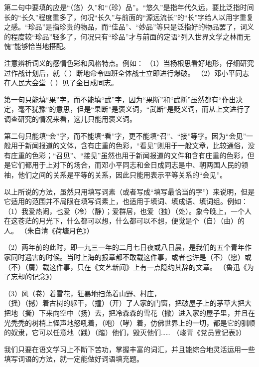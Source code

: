 第二句中要填的应是“（悠）久”和“（珍）品”。“悠久”是指年代久远，要比泛指时间长的“长久”程度重多了，何况“长久”与前面的“源远流长”的“长”字给人以用字重复之感。“珍品”是指珍贵的物品，而“佳品”、“妙品”等只是泛指好的物品罢了，词义的程度较“珍品”轻多了，何况只有“珍品”才与前面的定语“列入世界文学之林而无愧”能够恰当地搭配。

注意辨析词义的感情色彩和风格特点。例如：
（1）当杨根思看好地形，仔细研究过作战计划后，就（ ）断地命令四班全体战士立即进行爆破。
（2）邓小平同志在人民大会堂（ ）见了金日成同志。

第一句只能填“果”字，而不能填“武”字，因为“果断”和“武断”虽然都有“作出决定，毫不犹豫”的意思，但是“果断”是褒义词，“武断”是贬义词，而从上文进行了调查研究的情况来看，这儿只能用褒义词。

第二句只能填“会”字，而不能填“看”字，更不能填“召”、“接”等字。因为“会见”一般用于新闻报道的文体，含有庄重的色彩，“看见”则用于一般文章，比较通俗，没有庄重的色彩；“召见”、“接见”虽然也用于新闻报道的文件和含有庄重的色彩，但是它们都用于上对下的场合，而邓小平同志和金日成同志是中、朝两国人民的领袖，他们之间的关系是平等的关系，因此只能用表示平等关系的“会见”。

以上所说的方法，虽然只用填写词素（或者写成“填写最恰当的字”）来说明，但是它适用的范围并不局限在填写词素上，也适用于填词、填成语、填词组。例如：
（1）我爱热闹，也爱（冷）（静）；爱群居，也爱（独）（处）。象今晚上，一个人在这苍茫的月光下，什么都可以想，什么都可以不想，便觉是个（自）（由）的人。
（朱自清《荷塘月色》）

（2）两年前的此时，即一九三一年的二月七日夜或八日晨，是我们的五个青年作家同时遇害的时候。当时上海的报章都不敢载这件事，或者也许是（不）（愿）或（不）（屑）载这件事，只在《文艺新闻》上有一点隐约其辞的文章。
（鲁迅《为了忘却的记念》）

（3）风（卷）着雪花，狂暴地扫荡着山野、村庄，\\
（摇）（撼）着古树的躯干，（撞）（开）了人家的门窗，把破屋子上的茅草大把大把地（撕）下来向空中（扬）去，把冷森森的雪花（撒）进入家的屋子里，并且在光秃秃的树梢上怪声地怒吼着，（咆）（哮）着，仿佛世界上的一切，都是它的驯顺的奴隶，它可以任意地（践）（踏）他们，毁灭他们…… （峻青《党员登记表》）

我们只要在语文学习上不断下苦功，掌握丰富的词汇，并且能综合地灵活运用一些填写词语的方法，就一定能做好词语填充题。
\newpage
